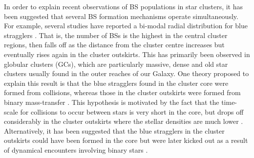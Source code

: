 In order to explain recent observations of BS populations in star
clusters, it has been suggested that several BS formation mechanisms
operate simultaneously.  For example,
several studies have reported a bi-modal radial distribution for blue
stragglers \citep[e.g.][]{ferraro97, ferraro99, ferraro04, lanzoni07,
  geller08}.  That is, the number of BSs is the highest in the central
cluster regions, then falls off as the distance from the cluster
centre increases but eventually rises
again in the cluster outskirts.  This has primarily been observed in
globular clusters (GCs), which are particularly massive, dense and old star
clusters 
usually found in the outer reaches of our Galaxy.  One theory proposed
to explain this
result is that the blue stragglers found in the cluster core were
formed from collisions, whereas
those in the cluster outskirts were formed from binary mass-transfer
\citep{ferraro04}.  This hypothesis is motivated by the fact that the
time-scale for collisions to occur between stars is very short in the
core, but drops off considerably in the cluster outskirts where the
stellar densities are much lower \citep{leonard89}.  Alternatively, it
has been suggested that the blue stragglers in the cluster
outskirts could have been formed in the core but were later kicked out
as a result of dynamical encounters involving binary stars
\citep[e.g.][]{sigurdsson93, mapelli06}.


